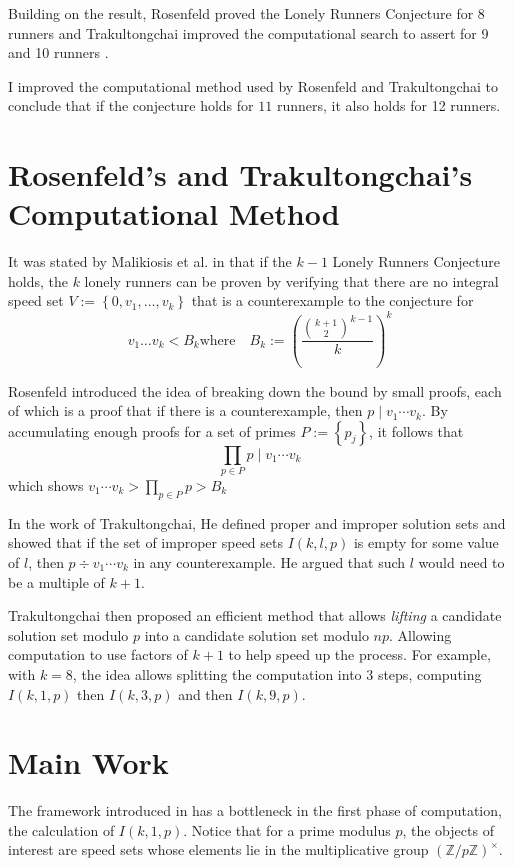 \documentclass[10pt,leqno]{amsart}
\newcommand{\set}[1]{\left\{#1\right\}}
\newcommand{\paren}[1]{\left(#1\right)}
\begin{document}
Building on the result, Rosenfeld proved the Lonely Runners Conjecture for 8 runners \cite{Rosenfeld} and 
Trakultongchai improved the computational search to assert for 9 and 10 runners \cite{Trakultongchai}.

I improved the computational method used by Rosenfeld and Trakultongchai to conclude that if the conjecture holds for $11$ runners, 
it also holds for 12 runners.

\section*{Rosenfeld's and Trakultongchai's Computational Method}
It was stated by Malikiosis et al. in \cite{Malikiosis} that if the $k-1$ Lonely Runners Conjecture holds, 
the $k$ lonely runners can be proven by verifying that there are no
integral speed set $V := \set{0, v_1, \dots, v_k}$ that is a counterexample to the conjecture for 
\[ v_1\dots v_k < B_k  \text{where} \quad B_k := \paren{\frac{\binom{k+1}{2}^{k-1}}{k}}^k \]

Rosenfeld introduced the idea of breaking down the bound by small proofs, each of which is a proof that if there is a counterexample, 
then $p \mid v_1 \cdots v_k$. By accumulating enough proofs for a set of primes $P := \set{p_j}$, it follows that 
\[ \prod_{p \in P} p \mid v_1\cdots v_k \] which shows $v_1 \cdots v_k > \prod_{p \in P} p > B_k$

In the work of Trakultongchai, He defined proper and improper solution sets and showed that 
if the set of improper speed sets $I(k, l, p)$ is empty for some value of $l$, then $p \div v_1\cdots v_k$ in any counterexample.
He argued that such $l$ would need to be a multiple of $k+1$. \cite{Trakultongchai} 

Trakultongchai then proposed an efficient method that allows \textit{lifting} a candidate solution set modulo $p$ 
into a candidate solution set modulo $np$. Allowing computation to use factors of $k+1$ to help speed up the process.
For example, with $k=8$, the idea allows splitting the computation into 3 steps, computing $I(k, 1, p)$ then $I(k, 3, p)$ 
and then $I(k, 9, p)$. 

\section*{Main Work}

The framework introduced in \cite{Trakultongchai} has a bottleneck in the first phase of computation, the 
calculation of $I(k, 1, p)$. 
Notice that for a prime modulus $p$, the objects of interest are speed sets whose elements lie in the multiplicative group
$(\mathbb{Z}/p\mathbb{Z})^\times$.  
\end{document}
